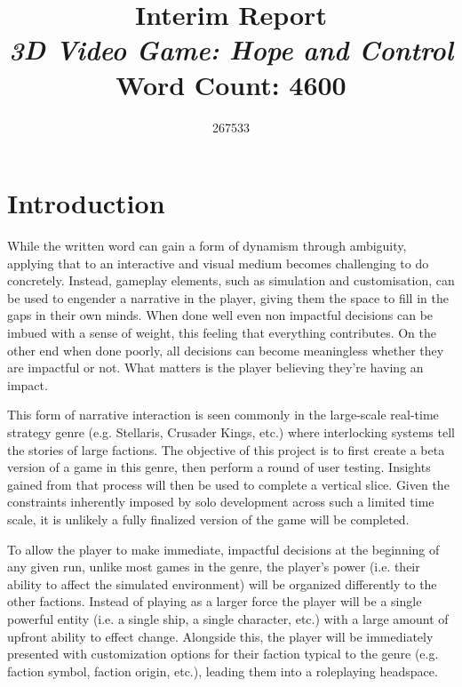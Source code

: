 \documentclass{report}
\begin{document}
\title{Interim Report \\
\textit{3D Video Game: Hope and Control}
\newline
\newline
\newline
\normalsize Word Count: 4600}
\author{267533}

\maketitle

\chapter{Introduction}
While the written word can gain a form of dynamism through ambiguity, applying that to an interactive and visual medium becomes challenging to do concretely. Instead, gameplay elements, such as simulation and customisation, can be used to engender a narrative in the player, giving them the space to fill in the gaps in their own minds. When done well even non impactful decisions can be imbued with a sense of weight, this feeling that everything contributes. On the other end when done poorly, all decisions can become meaningless whether they are impactful or not. What matters is the player believing they're having an impact. 

This form of narrative interaction is seen commonly in the large-scale real-time strategy genre (e.g. Stellaris, Crusader Kings, etc.) where interlocking systems tell the stories of large factions. The objective of this project is to first create a beta version of a game in this genre, then perform a round of user testing. Insights gained from that process will then be used to complete a vertical slice. Given the constraints inherently imposed by solo development across such a limited time scale, it is unlikely a fully finalized version of the game will be completed.

To allow the player to make immediate, impactful decisions at the beginning of any given run, unlike most games in the genre, the player's power (i.e. their ability to affect the simulated environment) will be organized differently to the other factions. Instead of playing as a larger force the player will be a single powerful entity (i.e. a single ship, a single character, etc.) with a large amount of upfront ability to effect change. Alongside this, the player will be immediately presented with customization options for their faction typical to the genre (e.g. faction symbol, faction origin, etc.), leading them into a roleplaying headspace. 
\end{document}
